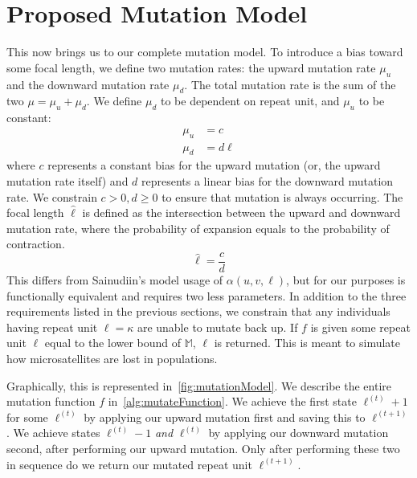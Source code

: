 \section{Proposed Mutation Model}\label{sec:proposedMutationModel}
This now brings us to our complete mutation model.
To introduce a bias toward some focal length, we define two mutation rates: the upward mutation rate $\mu_u$ and the
downward mutation rate $\mu_d$.
The total mutation rate is the sum of the two $\mu = \mu_u + \mu_d$.
We define $\mu_d$ to be dependent on repeat unit, and $\mu_u$ to be constant:
\begin{align}
    \mu_u &= c \\
    \mu_d &= d\ell
\end{align}
where $c$ represents a constant bias for the upward mutation (or, the upward mutation rate itself) and $d$ represents a
linear bias for the downward mutation rate.
We constrain $c > 0, d \geq 0$ to ensure that mutation is always occurring.
The focal length $\hat{\ell}$ is defined as the intersection between the upward and downward mutation rate, where the
probability of expansion equals to the probability of contraction.
\begin{equation}
    \hat{\ell} = \frac{c}{d}
\end{equation}
This differs from Sainudiin's model usage of $\alpha(u, v, \ell)$, but for our purposes is functionally equivalent and
requires two less parameters.
In addition to the three requirements listed in the previous sections, we constrain that any individuals having repeat
unit $\ell = \kappa$ are unable to mutate back up.
If $f$ is given some repeat unit $\ell$ equal to the lower bound of $\mathbb{M}$, $\ell$ is returned.
This is meant to simulate how microsatellites are lost in populations.

Graphically, this is represented in~\autoref{fig:mutationModel}.
We describe the entire mutation function $f$ in~\autoref{alg:mutateFunction}.
We achieve the first state $\ell^{(t)} + 1$ for some $\ell^{(t)}$ by applying our upward mutation first and saving this
to $\ell^{(t+1)}$.
We achieve states $\ell^{(t)} - 1$ \emph{and} $\ell^{(t)}$ by applying our downward mutation second, after performing
our upward mutation.
Only after performing these two in sequence do we return our mutated repeat unit $\ell^{(t + 1)}$.
